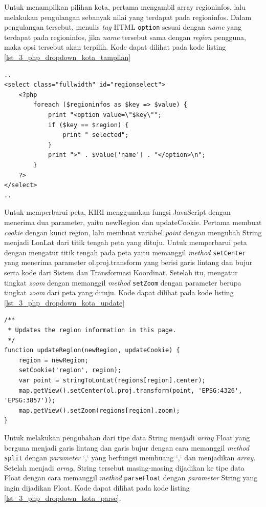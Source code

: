 Untuk menampilkan pilihan kota, pertama mengambil array regioninfos, lalu melakukan pengulangan sebanyak nilai yang terdapat pada regioninfos. Dalam pengulangan tersebut, menulis \textit{tag} HTML \verb!option! sesuai dengan \textit{name} yang terdapat pada regioninfos, jika \textit{name} tersebut sama dengan \textit{region} pengguna, maka opsi tersebut akan terpilih. Kode dapat dilihat pada kode listing \ref{lst_3_php_dropdown_kota_tampilan}

\begin{lstlisting}[caption=Menampilkan pilihan kota kepada pengguna ,label = {lst_3_php_dropdown_kota_tampilan}]
..
<select class="fullwidth" id="regionselect">
	<?php
		foreach ($regioninfos as $key => $value) {
			print "<option value=\"$key\"";
			if ($key == $region) {
				print " selected";
			}
			print ">" . $value['name'] . "</option>\n";
		}
	?>
</select>
..
\end{lstlisting}

Untuk memperbarui peta, KIRI menggunakan fungsi JavaScript dengan menerima dua parameter, yaitu newRegion dan updateCookie. Pertama membuat \textit{cookie} dengan kunci region, lalu membuat variabel \textit{point} dengan mengubah String menjadi LonLat dari titik tengah peta yang dituju. Untuk memperbarui peta dengan mengatur titik tengah pada peta yaitu memanggil \textit{method} \verb!setCenter! yang menerima parameter ol.proj.transform yang berisi garis lintang dan bujur serta kode dari Sistem  dan Transformasi  Koordinat. Setelah itu, mengatur tingkat \textit{zoom} dengan memanggil \textit{method} \verb!setZoom! dengan parameter berupa tingkat \textit{zoom} dari peta yang dituju. Kode dapat dilihat pada kode listing \ref{lst_3_php_dropdown_kota_update}

\begin{lstlisting}[caption=Fungsi JavaScript untuk memperbarui peta ,label = {lst_3_php_dropdown_kota_update}]
/**
 * Updates the region information in this page.
 */
function updateRegion(newRegion, updateCookie) {
	region = newRegion;
	setCookie('region', region);
	var point = stringToLonLat(regions[region].center);
	map.getView().setCenter(ol.proj.transform(point, 'EPSG:4326', 'EPSG:3857'));
	map.getView().setZoom(regions[region].zoom);
}
\end{lstlisting}

Untuk melakukan pengubahan dari tipe data String menjadi \textit{array} Float yang berguna menjadi garis lintang dan garis bujur dengan cara memanggil \textit{method} \verb!split! dengan \textit{parameter} `,` yang berfungsi membuang `,` dan menjadikan \textit{array}. Setelah menjadi \textit{array}, String tersebut masing-masing dijadikan ke tipe data Float dengan cara memanggil \textit{method} \verb!parseFloat! dengan \textit{parameter} String yang ingin dijadikan Float. Kode dapat dilihat pada kode listing \ref{lst_3_php_dropdown_kota_parse}.

